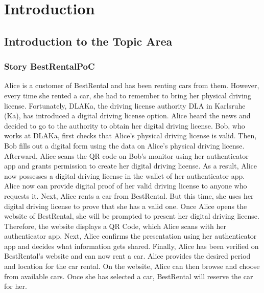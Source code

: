 \chapter{Introduction}
\label{cha:introduction}



\section{Introduction to the Topic Area}

\subsection{Story BestRentalPoC}
Alice is a customer of BestRental and has been renting cars from them.
However, every time she rented a car, she had to remember to bring her physical driving license.
Fortunately, DLAKa, the driving license authority DLA in Karlsruhe (Ka), 
has introduced a digital driving license option. Alice heard the news and decided to go
to the authority to obtain her digital driving license. Bob, who works at DLAKa,
first checks that Alice's physical driving license is valid. Then, Bob fills out a digital form
using the data on Alice's physical driving license. Afterward, Alice scans the QR code on Bob's monitor
using her authenticator app and grants permission to create her digital driving license.
As a result, Alice now possesses a digital driving license in the wallet of her authenticator app.
Alice now can provide digital proof of her valid driving license to anyone who requests it.
Next, Alice rents a car from BestRental. But this time, she uses her digital driving license
to prove that she has a valid one. Once Alice opens the website of BestRental,
she will be prompted to present her digital driving license. Therefore, the website displays a QR Code,
which Alice scans with her authenticator app. Next, Alice confirms the presentation using
her authenticator app and decides what information gets shared. 
Finally, Alice has been verified on BestRental's website and can now rent a car. 
Alice provides the desired period and location for the car rental.
On the website, Alice can then browse and choose from available cars.
Once she has selected a car, BestRental will reserve the car for her.


